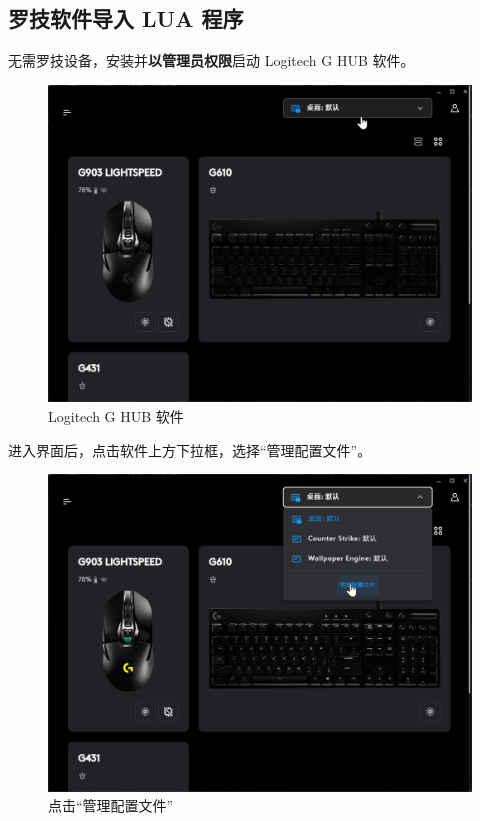 \subsection{罗技软件导入 LUA 程序}

无需罗技设备，安装并\textbf{以管理员权限}启动 Logitech G HUB 软件。

\begin{figure}[H]
    \Centering
    \includegraphics[width=\textwidth]{docs/assets/lghub.png}
    \caption{Logitech G HUB 软件}
\end{figure}

进入界面后，点击软件上方下拉框，选择“管理配置文件”。

\begin{figure}[H]
    \Centering
    \includegraphics[width=\textwidth]{docs/assets/manage_configs.png}
    \caption{点击“管理配置文件”}
\end{figure}

